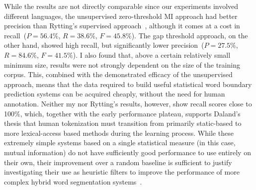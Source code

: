 While the results are not directly comparable since our experiments involved different languages, the unsupervised zero-threshold MI approach had better precision than Rytting's supervised approach~\cite{rytting04}, although it comes at a cost in recall\textemdash~($P = 56.4\%$, $R = 38.6\%$, $F = 45.8\%$). The gap threshold approach, on the other hand, showed high recall, but significantly lower precision\textemdash~($P = 27.5\%$, $R = 84.6\%$, $F = 41.5\%$). I also found that, above a certain relatively small minimum size, results were not strongly dependent on the size of the training corpus. This, combined with the demonstrated efficacy of the unsupervised approach, means that the data required to build useful statistical word boundary prediction systems can be acquired cheaply, without the need for human annotation. Neither my nor Rytting's results, however, show recall scores close to 100\%, which, together with the early performance plateau, supports Daland's thesis that human tokenization must transition from primarily static-based to more lexical-access based methods during the learning process. While these extremely simple systems based on a single statistical measure (in this case, mutual information) do not have sufficiently good performance to use entirely on their own, their improvement over a random baseline is sufficient to justify investigating their use as heuristic filters to improve the performance of more complex hybrid word segmentation systems~\cite{kearsley14}.

